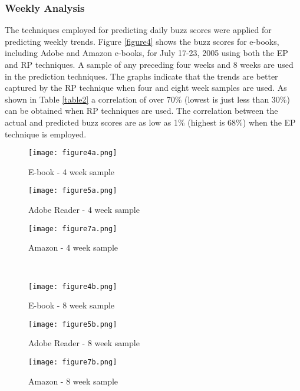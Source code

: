 \documentclass[10pt, conference, compsocconf]{IEEEtran}
\begin{document}
\subsubsection{Weekly Analysis}
The techniques employed for predicting daily buzz scores were applied for predicting weekly trends. Figure \ref{figure4} shows the buzz scores for e-books, including Adobe and Amazon e-books, for July 17-23, 2005 using both the EP and RP techniques. A sample of any preceding four weeks and 8 weeks are used in the prediction techniques. The graphs indicate that the trends are better captured by the RP technique when four and eight week samples are used. As shown in Table \ref{table2} a correlation of over 70\% (lowest is just less than 30\%) can be obtained when RP techniques are used. The correlation between the actual and predicted buzz scores are as low as 1\% (highest is 68\%) when the EP technique is employed. 

\begin{figure*}
	\centering
	\begin{subfigure} {0.328\textwidth}
		\centering
  		\texttt{[image: figure4a.png]}
  		\caption{E-book - 4 week sample}
  		\label{figure4a}
	\end{subfigure} \hfill
	\begin{subfigure} {0.328\textwidth}
		\centering
  		\texttt{[image: figure5a.png]}
  		\caption{Adobe Reader - 4 week sample}
  		\label{figure5a}
	\end{subfigure} \hfill
	\begin{subfigure} {0.328\textwidth}
		\centering
  		\texttt{[image: figure7a.png]}
  		\caption{Amazon - 4 week sample}
  		\label{figure7a}
	\end{subfigure}\\
	\begin{subfigure} {0.328\textwidth}
		\centering
		\texttt{[image: figure4b.png]}
		\caption{E-book - 8 week sample}
		\label{figure4b}
	\end{subfigure} \hfill
	\begin{subfigure} {0.328\textwidth}
		\centering
		\texttt{[image: figure5b.png]}
		\caption{Adobe Reader - 8 week sample}
		\label{figure5b}
	\end{subfigure} \hfill
	\begin{subfigure} {0.328\textwidth}
		\centering
  		\texttt{[image: figure7b.png]}
  		\caption{Amazon - 8 week sample}
  		\label{figure7b}
	\end{subfigure}\caption{Predicted buzz scores of E-books (including Adobe Reader and Amazon) for July 17 - 23 using EP and RP techniques}
	\label{figure4}
\end{figure*}
\end{document}
